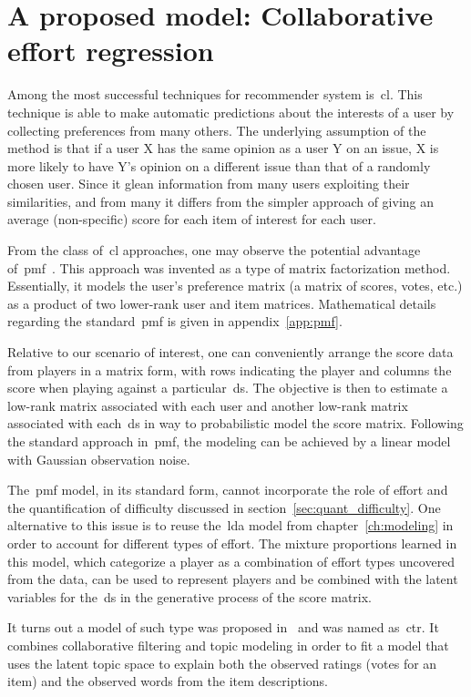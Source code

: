 \section{A proposed model: Collaborative effort regression}

Among the most successful techniques for recommender system is~\gls{cl}. This technique is able to make automatic predictions about the interests of a user by collecting preferences from many others. The underlying assumption of the method is that if a user X has the same opinion as a user Y on an issue, X is more likely to have Y's opinion on a different issue than that of a randomly chosen user. Since it glean information from many users exploiting their similarities, and from many it differs from the simpler approach of giving an average (non-specific) score for each item of interest for each user.

From the class of~\gls{cl} approaches, one may observe the potential advantage of~\gls{pmf}~\citep{mnih_probabilistic_2008}. This approach was invented as a type of matrix factorization method. Essentially, it models the user's preference matrix (a matrix of scores, votes, etc.) as a product of two lower-rank user and item matrices. Mathematical details regarding the standard~\gls{pmf} is given in appendix~\ref{app:pmf}.

Relative to our scenario of interest, one can conveniently arrange the score data from players in a matrix form, with rows indicating the player and columns the score when playing against a particular~\gls{ds}. The objective is then to estimate a low-rank matrix associated with each user and another low-rank matrix associated with each~\gls{ds} in way to probabilistic model the score matrix. Following the standard approach in~\gls{pmf}, the modeling can be achieved by a linear model with Gaussian observation noise. 

The~\gls{pmf} model, in its standard form, cannot incorporate the role of effort and the quantification of difficulty discussed in section~\ref{sec:quant_difficulty}. One alternative to this issue is to reuse the~\gls{lda} model from chapter~\ref{ch:modeling} in order to account for different types of effort. The mixture proportions learned in this model, which categorize a player as a combination of effort types uncovered from the data, can be used to represent players and be combined with the latent variables for the~\gls{ds} in the generative process of the score matrix.

It turns out a model of such type was proposed in~\cite{wang_collaborative_2011} and was named as~\gls{ctr}. It combines collaborative filtering and topic modeling in order to fit a model that uses the latent topic space to explain both the observed ratings (votes for an item) and the observed words from the item descriptions. 

